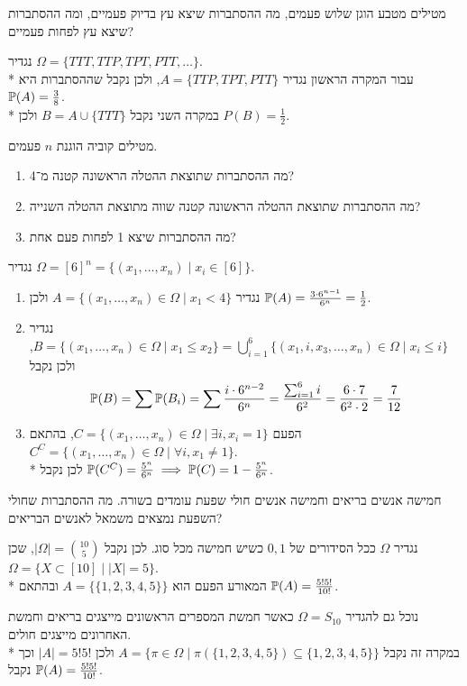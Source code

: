 \begin{exercise}
	מטילים מטבע הוגן שלוש פעמים, מה ההסתברות שיצא עץ בדיוק פעמיים, ומה ההסתברות שיצא עץ לפחות פעמיים?
\end{exercise}
\begin{solution}
	נגדיר $\Omega = \{ TTT, TTP, TPT, PTT, \dots \}$. \\*
	עבור המקרה הראשון נגדיר $A = \{ TTP, TPT, PTT \}$, ולכן נקבל שההסתברות היא $\mathbb{P}(A) = \frac{3}{8}$. \\*
	במקרה השני נקבל $B = A \cup \{ TTT \}$ ולכן $P(B) = \frac{1}{2}$.
\end{solution}
\begin{exercise}
	מטילים קוביה הוגנת $n$ פעמים.
	\begin{enumerate}
		\item מה ההסתברות שתוצאת ההטלה הראשונה קטנה מ־4?
		\item מה ההסתברות שתוצאת ההטלה הראשונה קטנה שווה מתוצאת ההטלה השנייה?
		\item מה ההסתברות שיצא 1 לפחות פעם אחת?
	\end{enumerate}
\end{exercise}
\begin{solution}
	נגדיר $\Omega = {[6]}^n = \{ (x_1, \dots, x_n) \mid x_i \in [6] \}$.
	\begin{enumerate}
		\item נגדיר $A = \{ (x_1, \dots, x_n) \in \Omega \mid x_1 < 4 \}$ ולכן $\mathbb{P}(A) = \frac{3 \cdot 6^{n - 1}}{6^n} = \frac{1}{2}$.
		\item נגדיר $B = \{ (x_1, \dots, x_n) \in \Omega \mid x_1 \le x_2 \} = \bigcup_{i = 1}^6 \{ (x_1, i, x_3, \dots, x_n) \in \Omega \mid x_i \le i \}$, ולכן נקבל
			\[
				\mathbb{P}(B) = \sum \mathbb{P}(B_i) = \sum \frac{i \cdot 6^{n - 2}}{6^n} = \frac{\sum_{i = 1}^{6} i}{6^2} = \frac{6 \cdot 7}{6^2 \cdot 2} = \frac{7}{12}
			\]
		\item הפעם $C = \{ (x_1, \dots, x_n) \in \Omega \mid \exists i, x_i = 1 \}$, בהתאם $C^C = \{ (x_1, \dots, x_n) \in \Omega \mid \forall i, x_1 \ne 1 \}$. \\*
			לכן נקבל $\mathbb{P}(C^C) = \frac{5^n}{6^n} \implies \mathbb{P}(C) = 1 - \frac{5^n}{6^n}$.
	\end{enumerate}
\end{solution}
\begin{exercise}
	חמישה אנשים בריאים וחמישה אנשים חולי שפעת עומדים בשורה. מה ההסתברות שחולי השפעת נמצאים משמאל לאנשים הבריאים?
\end{exercise}
\begin{solution}
	נגדיר $\Omega$ ככל הסידורים של $0, 1$ כשיש חמישה מכל סוג.
	לכן נקבל $|\Omega| = \binom{10}{5}$, שכן $\Omega = \{ X \subset [10] \mid |X| = 5 \}$. \\*
	המאורע הפעם הוא $A = \{ \{ 1, 2, 3, 4, 5 \} \}$ ובהתאם $\mathbb{P}(A) = \frac{5! 5!}{10!}$.

	נוכל גם להגדיר $\Omega = S_{10}$ כאשר חמשת המספרים הראשונים מייצגים בריאים וחמשת האחרונים מייצגים חולים. \\*
	במקרה זה נקבל $A = \{ \pi \in \Omega \mid \pi(\{1, 2, 3, 4, 5\}) \subseteq \{1, 2, 3, 4, 5\} \}$ ולכן $|A| = 5! 5! $ וכך נקבל $\mathbb{P}(A) = \frac{5! 5!}{10!}$.
\end{solution}

